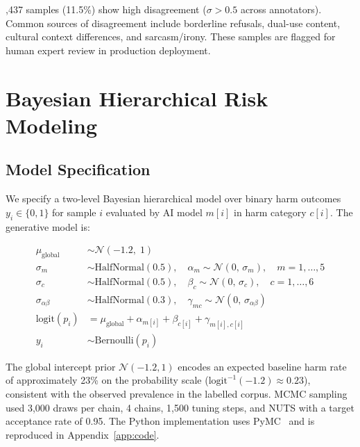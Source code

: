 \documentclass[10pt,letterpaper]{article}
\begin{document}
,437 samples (11.5\%) show high disagreement ($\sigma > 0.5$ across
annotators).  Common sources of disagreement include borderline refusals,
dual-use content, cultural context differences, and sarcasm/irony.  These
samples are flagged for human expert review in production deployment.

\section{Bayesian Hierarchical Risk Modeling}
\label{sec:bayes}

\subsection{Model Specification}

We specify a two-level Bayesian hierarchical model over binary harm outcomes
$y_i \in \{0,1\}$ for sample $i$ evaluated by AI model $m[i]$ in harm
category $c[i]$.  The generative model is:

\begin{align}
  \mu_{\mathrm{global}} &\sim \mathcal{N}(-1.2,\; 1)
    \label{eq:mu_global}\\
  \sigma_m &\sim \mathrm{HalfNormal}(0.5), \quad
    \alpha_m \sim \mathcal{N}(0,\, \sigma_m), \quad m=1,\ldots,5
    \label{eq:model_effect}\\
  \sigma_c &\sim \mathrm{HalfNormal}(0.5), \quad
    \beta_c \sim \mathcal{N}(0,\, \sigma_c), \quad c=1,\ldots,6
    \label{eq:cat_effect}\\
  \sigma_{\alpha\beta} &\sim \mathrm{HalfNormal}(0.3), \quad
    \gamma_{mc} \sim \mathcal{N}(0,\, \sigma_{\alpha\beta})
    \label{eq:interaction}\\
  \mathrm{logit}(p_i) &= \mu_{\mathrm{global}} +
    \alpha_{m[i]} + \beta_{c[i]} + \gamma_{m[i],c[i]}
    \label{eq:logit}\\
  y_i &\sim \mathrm{Bernoulli}(p_i)
    \label{eq:likelihood}
\end{align}

The global intercept prior $\mathcal{N}(-1.2, 1)$ encodes an expected baseline
harm rate of approximately 23\% on the probability scale
($\mathrm{logit}^{-1}(-1.2) \approx 0.23$), consistent with the observed
prevalence in the labelled corpus.  MCMC sampling used 3,000 draws per chain,
4 chains, 1,500 tuning steps, and NUTS with a target acceptance rate of 0.95.
The Python implementation uses PyMC~\citep{abril2023pymc} and is reproduced in
Appendix~\ref{app:code}.
\end{document}
